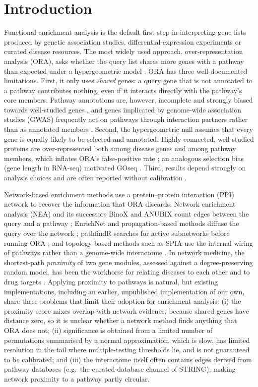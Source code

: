 \section{Introduction}
Functional enrichment analysis is the default first step in interpreting gene lists produced by genetic association studies, differential-expression experiments or curated disease resources. The most widely used approach, over-representation analysis (ORA), asks whether the query list shares more genes with a pathway than expected under a hypergeometric model \citep{Huang2009}. ORA has three well-documented limitations. First, it only uses \emph{shared} genes: a query gene that is not annotated to a pathway contributes nothing, even if it interacts directly with the pathway's core members. Pathway annotations are, however, incomplete and strongly biased towards well-studied genes \citep{Haynes2018}, and genes implicated by genome-wide association studies (GWAS) frequently act on pathways through interaction partners rather than as annotated members \citep{Barabasi2011,Cowen2017}. Second, the hypergeometric null assumes that every gene is equally likely to be selected and annotated. Highly connected, well-studied proteins are over-represented both among disease genes and among pathway members, which inflates ORA's false-positive rate \citep{Timmons2015,Haynes2018}; an analogous selection bias (gene length in RNA-seq) motivated GOseq \citep{Young2010}. Third, results depend strongly on analysis choices and are often reported without calibration \citep{Wijesooriya2022}.

Network-based enrichment methods use a protein--protein interaction (PPI) network to recover the information that ORA discards. Network enrichment analysis (NEA) and its successors BinoX and ANUBIX count edges between the query and a pathway \citep{Alexeyenko2012,Ogris2017,CastresanaAguirre2020}; EnrichNet and propagation-based methods diffuse the query over the network \citep{Glaab2012,Cowen2017}; pathfindR searches for active subnetworks before running ORA \citep{Ulgen2019}; and topology-based methods such as SPIA use the internal wiring of pathways rather than a genome-wide interactome \citep{Ma2019}. In network medicine, the shortest-path \emph{proximity} of two gene modules, assessed against a degree-preserving random model, has been the workhorse for relating diseases to each other and to drug targets \citep{Menche2015,Guney2016,MorselliGysi2021}. Applying proximity to pathways is natural, but existing implementations, including an earlier, unpublished implementation of our own, share three problems that limit their adoption for enrichment analysis: (i) the proximity score mixes overlap with network evidence, because shared genes have distance zero, so it is unclear whether a network method finds anything that ORA does not; (ii) significance is obtained from a limited number of permutations summarised by a normal approximation, which is slow, has limited resolution in the tail where multiple-testing thresholds lie, and is not guaranteed to be calibrated; and (iii) the interactome itself often contains edges derived from pathway databases (e.g.\ the curated-database channel of STRING), making network proximity to a pathway partly circular.


